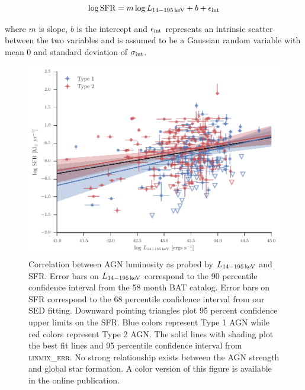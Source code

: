 \documentclass[fleqn, usenatbib]{mnras}
\begin{document}
\begin{equation}
\log {\rm SFR} = m\log L_{\rm 14-195\,keV} + b + \epsilon_{\rm int}
\end{equation}

\noindent where $m$ is slope, $b$ is the intercept and $\epsilon_{\rm int}$ represents an intrinsic scatter between the two variables and is assumed to be a Gaussian random variable with mean 0 and standard deviation of $\sigma_{\rm int}$. 

\begin{figure}
\includegraphics{figures/sfr_lbat_correlation}
\caption{Correlation between AGN luminosity as probed by $L_{\rm 14-195\,keV}$ and SFR. Error bars on $L_{\rm14-195\,keV}$ correspond to the 90 percentile confidence interval from the 58 month BAT catalog. Error bars on SFR correspond to the 68 percentile confidence interval from our SED fitting. Downward pointing triangles plot 95 percent confidence upper limits on the SFR. Blue colors represent Type 1 AGN while red colors represent Type 2 AGN. The solid lines with shading plot the best fit lines and 95 percentile confidence interval from \textsc{linmix\_err}. No strong relationship exists between the AGN strength and global star formation. A color version of this figure is available in the online publication.\label{fig:sfr_lbat_correlation}}
\end{figure}
\end{document}
